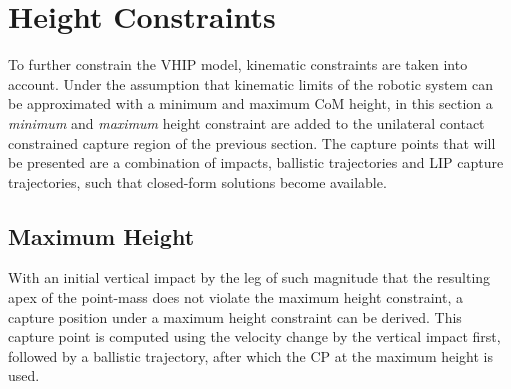 \section{Height Constraints}
To further constrain the \ac{VHIP} model, kinematic constraints are taken into account. Under the assumption that kinematic limits of the robotic system can be approximated with a minimum and maximum \ac{CoM} height, in this section a \textit{minimum} and \textit{maximum} height constraint are added to the unilateral contact constrained capture region of the previous section. The capture points that will be presented are a combination of impacts, ballistic trajectories and \ac{LIP} capture trajectories, such that closed-form solutions become available. 

\subsection{Maximum Height}
With an initial vertical impact by the leg of such magnitude that the resulting apex of the point-mass does not violate the maximum height constraint, a capture position under a maximum height constraint can be derived. This capture point is computed using the velocity change by the vertical impact first, followed by a ballistic trajectory, after which the \ac{CP} at the maximum height is used.

